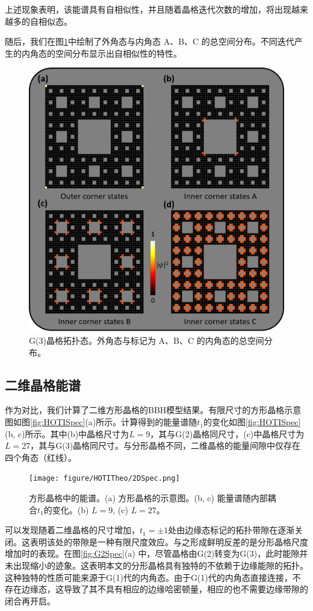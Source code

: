 上述现象表明，该能谱具有自相似性，并且随着晶格迭代次数的增加，将出现越来越多的自相似态。

随后，我们在图\ref{fig:G2Field}中绘制了外角态与内角态 A、B、C 的总空间分布。不同迭代产生的内角态的空间分布显示出自相似性的特性。

\begin{figure}[htbp]
    \centering
    \includegraphics[width=0.5\linewidth]{figure/HOTITheo/G2Field.png}
    \caption{G(3)晶格拓扑态。外角态与标记为 A、B、C 的内角态的总空间分布。}
    \label{fig:G2Field}
\end{figure}

\subsection{二维晶格能谱}
作为对比，我们计算了二维方形晶格的BBH模型结果。有限尺寸的方形晶格示意图如图\ref{fig:HOTISpec}(a)所示。计算得到的能量谱随$t_1$的变化如图\ref{fig:HOTISpec}(b, c)所示。其中(b)中晶格尺寸为$L=9$，其与G(2)晶格同尺寸，(c)中晶格尺寸为$L=27$，其与G(3)晶格同尺寸。与分形晶格不同，二维晶格的能量间隙中仅存在四个角态（红线）。
\begin{figure}[htbp]
    \centering
    \texttt{[image: figure/HOTITheo/2DSpec.png]}
    \caption{方形晶格中的能谱。(a) 方形晶格的示意图。(b, c) 能量谱随内部耦合$t_1$的变化。(b) $L=9$, (c) $L=27$。}
    \label{fig:2DSpec}
\end{figure}

可以发现随着二维晶格的尺寸增加，$t_1=\pm1$处由边缘态标记的拓扑带隙在逐渐关闭。这表明该处的带隙是一种有限尺度效应。与之形成鲜明反差的是分形晶格尺度增加时的表现。在图\ref{fig:G2Spec}(a) 中，尽管晶格由G(2)转变为G(3)，此时能隙并未出现缩小的迹象。这表明本文的分形晶格具有独特的不依赖于边缘能隙的拓扑。这种独特的性质可能来源于G(1)代的内角态。由于G(1)代的内角态直接连接，不存在边缘态，这导致了其不具有相应的边缘哈密顿量，相应的也不需要边缘带隙的闭合再开启。

